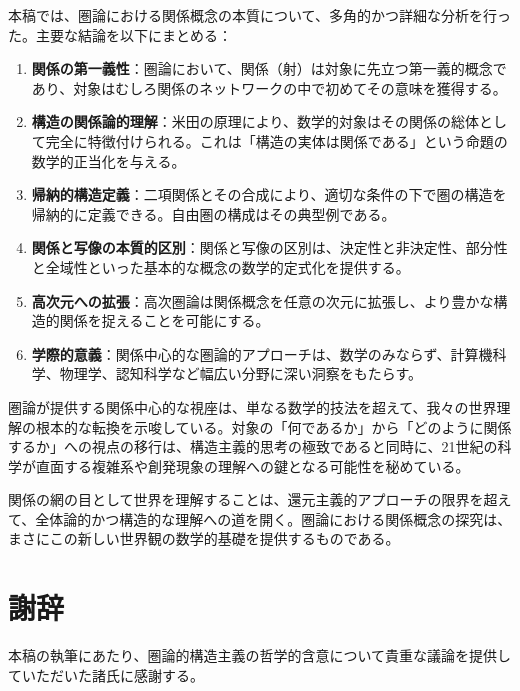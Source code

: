 \documentclass[11pt,a4paper,twocolumn]{ltjsarticle}
\theoremstyle{definition}
\theoremstyle{plain}
\begin{document}
本稿では、圏論における関係概念の本質について、多角的かつ詳細な分析を行った。主要な結論を以下にまとめる：

\begin{enumerate}
\item \textbf{関係の第一義性}：圏論において、関係（射）は対象に先立つ第一義的概念であり、対象はむしろ関係のネットワークの中で初めてその意味を獲得する。

\item \textbf{構造の関係論的理解}：米田の原理により、数学的対象はその関係の総体として完全に特徴付けられる。これは「構造の実体は関係である」という命題の数学的正当化を与える。

\item \textbf{帰納的構造定義}：二項関係とその合成により、適切な条件の下で圏の構造を帰納的に定義できる。自由圏の構成はその典型例である。

\item \textbf{関係と写像の本質的区別}：関係と写像の区別は、決定性と非決定性、部分性と全域性といった基本的な概念の数学的定式化を提供する。

\item \textbf{高次元への拡張}：高次圏論は関係概念を任意の次元に拡張し、より豊かな構造的関係を捉えることを可能にする。

\item \textbf{学際的意義}：関係中心的な圏論的アプローチは、数学のみならず、計算機科学、物理学、認知科学など幅広い分野に深い洞察をもたらす。
\end{enumerate}

圏論が提供する関係中心的な視座は、単なる数学的技法を超えて、我々の世界理解の根本的な転換を示唆している。対象の「何であるか」から「どのように関係するか」への視点の移行は、構造主義的思考の極致であると同時に、21世紀の科学が直面する複雑系や創発現象の理解への鍵となる可能性を秘めている。

関係の網の目として世界を理解することは、還元主義的アプローチの限界を超えて、全体論的かつ構造的な理解への道を開く。圏論における関係概念の探究は、まさにこの新しい世界観の数学的基礎を提供するものである。

\balance

\section*{謝辞}

本稿の執筆にあたり、圏論的構造主義の哲学的含意について貴重な議論を提供していただいた諸氏に感謝する。
\end{document}
